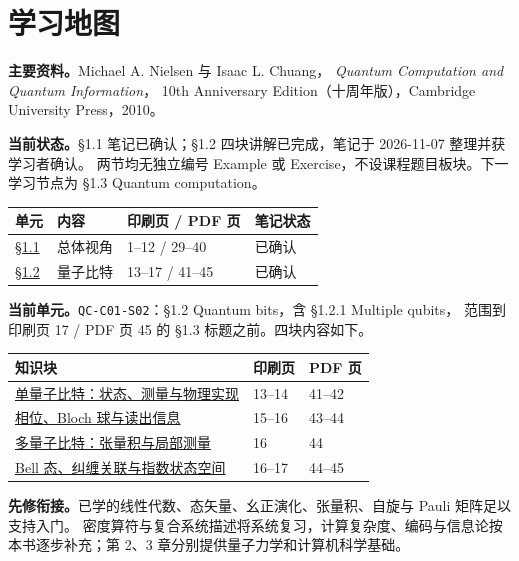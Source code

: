 \section*{学习地图}

\textbf{主要资料。}Michael A. Nielsen 与 Isaac L. Chuang，
\emph{Quantum Computation and Quantum Information}，
10th Anniversary Edition（十周年版），Cambridge University Press，2010。

\textbf{当前状态。}\S 1.1 笔记已确认；\S 1.2 四块讲解已完成，笔记于 2026-11-07 整理并获学习者确认。
两节均无独立编号 Example 或 Exercise，不设课程题目板块。下一学习节点为 \S 1.3 Quantum computation。

\begin{center}
\begin{tabularx}{\textwidth}{@{}lXll@{}}
\toprule
单元 & 内容 & 印刷页 / PDF 页 & 笔记状态 \\
\midrule
\hyperref[section:QC-C01-S01]{\S 1.1} & 总体视角 & 1--12 / 29--40 & 已确认 \\
\hyperref[section:QC-C01-S02]{\S 1.2} & 量子比特 & 13--17 / 41--45 & 已确认 \\
\bottomrule
\end{tabularx}
\end{center}

\textbf{当前单元。}\texttt{QC-C01-S02}：\S 1.2 Quantum bits，含 \S 1.2.1 Multiple qubits，
范围到印刷页 17 / PDF 页 45 的 \S 1.3 标题之前。四块内容如下。
\begin{center}
\begin{tabularx}{\textwidth}{@{}Xll@{}}
\toprule
知识块 & 印刷页 & PDF 页 \\
\midrule
\hyperref[topic:QC-C01-S02-T01]{单量子比特：状态、测量与物理实现} & 13--14 & 41--42 \\
\hyperref[topic:QC-C01-S02-T02]{相位、Bloch 球与读出信息} & 15--16 & 43--44 \\
\hyperref[topic:QC-C01-S02-T03]{多量子比特：张量积与局部测量} & 16 & 44 \\
\hyperref[topic:QC-C01-S02-T04]{Bell 态、纠缠关联与指数状态空间} & 16--17 & 44--45 \\
\bottomrule
\end{tabularx}
\end{center}

\textbf{先修衔接。}已学的线性代数、态矢量、幺正演化、张量积、自旋与 Pauli 矩阵足以支持入门。
密度算符与复合系统描述将系统复习，计算复杂度、编码与信息论按本书逐步补充；第 2、3 章分别提供量子力学和计算机科学基础。
